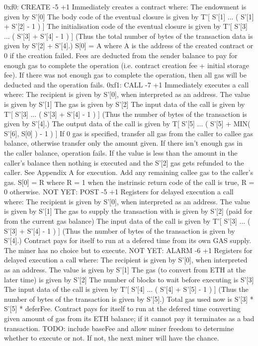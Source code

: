 \documentclass[9pt,oneside]{amsart}
\begin{document}
\begin{multicols}{2}
0xf0: CREATE -5 +1
Immediately creates a contract where:
The endowment is given by S'[0]
The body code of the eventual closure is given by T'[ S'[1] ... ( S'[1] + S'[2] - 1 ) ]
The initialisation code of the eventual closure is given by T'[ S'[3] ... ( S'[3] + S'[4] - 1 ) ]
(Thus the total number of bytes of the transaction data is given by S'[2] + S'[4].)
S[0] = A
where A is the address of the created contract or 0 if the creation failed.
Fees are deducted from the sender balance to pay for enough gas to complete the operation (i.e. contract creation fee + initial storage fee). If there was not enough gas to complete the operation, then all gas will be deducted and the operation fails.
0xf1: CALL -7 +1
Immediately executes a call where:
The recipient is given by S'[0], when interpreted as an address.
The value is given by S'[1]
The gas is given by S'[2]
The input data of the call is given by T'[ S'[3] ... ( S'[3] + S'[4] - 1 ) ]
(Thus the number of bytes of the transaction is given by S'[4].)
The output data of the call is given by T[ S'[5] ... ( S'[5] + MIN( S'[6], S[0] ) - 1 ) ]
If 0 gas is specified, transfer all gas from the caller to callee gas balance, otherwise transfer only the amount given. If there isn't enough gas in the caller balance, operation fails.
If the value is less than the amount in the caller's balance then nothing is executed and the S'[2] gas gets refunded to the caller.
See Appendix A for execution.
Add any remaining callee gas to the caller's gas.
S[0] = R
where R = 1 when the instrinsic return code of the call is true, R = 0 otherwise.
NOT YET: POST -5 +1
Registers for delayed execution a call where:
The recipient is given by S'[0], when interpreted as an address.
The value is given by S'[1]
The gas to supply the transaction with is given by S'[2] (paid for from the current gas balance)
The input data of the call is given by T'[ S'[3] ... ( S'[3] + S'[4] - 1 ) ]
(Thus the number of bytes of the transaction is given by S'[4].)
Contract pays for itself to run at a defered time from its own GAS supply. The miner has no choice but to execute.
NOT YET: ALARM -6 +1
Registers for delayed execution a call where:
The recipient is given by S'[0], when interpreted as an address.
The value is given by S'[1]
The gas (to convert from ETH at the later time) is given by S'[2]
The number of blocks to wait before executing is S'[3]
The input data of the call is given by T'[ S'[4] ... ( S'[4] + S'[5] - 1 ) ]
(Thus the number of bytes of the transaction is given by S'[5].)
Total gas used now is S'[3] * S'[5] * deferFee.
Contract pays for itself to run at the defered time converting given amount of gas from its ETH balance; if it cannot pay it terminates as a bad transaction. TODO: include baseFee and allow miner freedom to determine whether to execute or not. If not, the next miner will have the chance.

\end{multicols}
\end{document}
